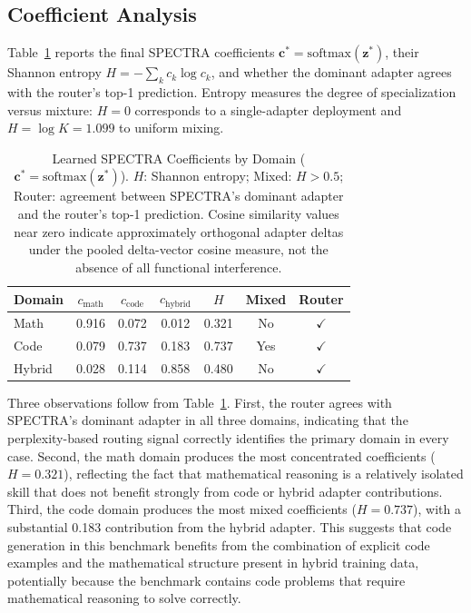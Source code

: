 \documentclass[preprint,12pt]{elsarticle}
\begin{document}
\subsection{Coefficient Analysis}
\label{subsec:coeff_analysis}

Table~\ref{tab:coefficients} reports the final SPECTRA coefficients
$\mathbf{c}^* = \mathrm{softmax}(\mathbf{z}^*)$, their Shannon entropy
$H = -\sum_k c_k \log c_k$, and whether the dominant adapter agrees with the
router's top-1 prediction. Entropy measures the degree of specialization versus
mixture: $H = 0$ corresponds to a single-adapter deployment and
$H = \log K = 1.099$ to uniform mixing.

\begin{table}[t]
\centering
\caption{Learned SPECTRA Coefficients by Domain ($\mathbf{c}^*=\mathrm{softmax}(\mathbf{z}^*)$). $H$: Shannon entropy; Mixed: $H > 0.5$; Router: agreement between SPECTRA's dominant adapter and the router's top-1 prediction. Cosine similarity values near zero indicate approximately orthogonal adapter deltas under the pooled delta-vector cosine measure, not the absence of all functional interference.}
\label{tab:coefficients}
\begin{tabular}{lcccccc}
\toprule
\textbf{Domain} &
$c_{\text{math}}$ & $c_{\text{code}}$ & $c_{\text{hybrid}}$ &
$H$ & \textbf{Mixed} & \textbf{Router} \\
\midrule
Math   & 0.916 & 0.072 & 0.012 & 0.321 & No  & $\checkmark$ \\
Code   & 0.079 & 0.737 & 0.183 & 0.737 & Yes & $\checkmark$ \\
Hybrid & 0.028 & 0.114 & 0.858 & 0.480 & No  & $\checkmark$ \\
\bottomrule
\end{tabular}
\end{table}

Three observations follow from Table~\ref{tab:coefficients}. First, the router
agrees with SPECTRA's dominant adapter in all three domains, indicating that
the perplexity-based routing signal correctly identifies the primary domain
in every case. Second, the math domain produces the most concentrated
coefficients ($H = 0.321$), reflecting the fact that mathematical reasoning
is a relatively isolated skill that does not benefit strongly from code or
hybrid adapter contributions. Third, the code domain produces the most mixed
coefficients ($H = 0.737$), with a substantial 0.183 contribution from the
hybrid adapter. This suggests that code generation in this benchmark benefits
from the combination of explicit code examples and the mathematical structure
present in hybrid training data, potentially because the benchmark contains
code problems that require mathematical reasoning to solve correctly.
\end{document}
